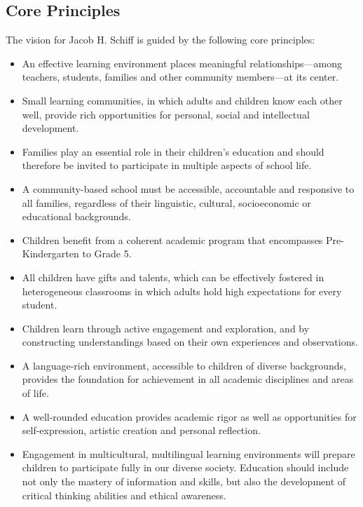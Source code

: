 \documentclass[11pt, letterpaper]{article}
\begin{document}
\subsection{Core Principles}
The vision for Jacob H. Schiff is guided by the following core principles:
\begin{itemize}
\item An effective learning environment places meaningful relationships—among teachers, students, families and other community members—at its center. 
\item Small learning communities, in which adults and children know each other well, provide rich opportunities for personal, social and intellectual development.
\item Families play an essential role in their children’s education and should therefore be invited to participate in multiple aspects of school life.
\item A community-based school must be accessible, accountable and responsive to all families, regardless of their linguistic, cultural, socioeconomic or educational backgrounds.
\item Children benefit from a coherent academic program that encompasses Pre-Kindergarten to Grade 5.
\item All children have gifts and talents, which can be effectively fostered in heterogeneous classrooms in which adults hold high expectations for every student.
\item Children learn through active engagement and exploration, and by constructing understandings based on their own experiences and observations.
\item A language-rich environment, accessible to children of diverse backgrounds, provides the foundation for achievement in all academic disciplines and areas of life.
\item A well-rounded education provides academic rigor as well as opportunities for self-expression, artistic creation and personal reflection.
\item Engagement in multicultural, multilingual learning environments will prepare children to participate fully in our diverse society.
Education should include not only the mastery of information and skills, but also the development of critical thinking abilities and ethical awareness.
\end{itemize}
\end{document}
